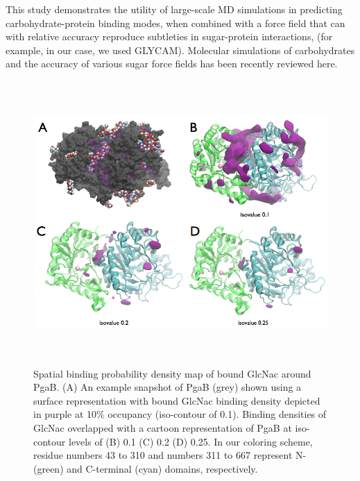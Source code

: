 This study demonstrates the utility of large-scale MD simulations in predicting carbohydrate-protein binding modes, when combined with a force field that can with relative accuracy reproduce subtleties in sugar-protein interactions, (for example, in our case, we used GLYCAM). Molecular simulations of carbohydrates and the accuracy of various sugar force fields has been recently reviewed here.\cite{Fadda:2010p5889}

\begin{figure}[htbp]
\centering
\includegraphics[height=4.25in, width=6in]{figures/results4/figure_pgab_density.png}
\caption[NAG binding density]{Spatial binding probability density map of bound GlcNac around PgaB.  (A) An example snapshot of PgaB (grey) shown using a surface representation with bound GlcNac binding density depicted in purple at 10\% occupancy (iso-contour of 0.1). Binding densities of GlcNac overlapped with a cartoon representation of PgaB at iso-contour levels of (B) 0.1 (C) 0.2 (D) 0.25. In our coloring scheme, residue numbers 43 to 310 and numbers 311 to 667 represent N- (green) and C-terminal (cyan) domains, respectively.  }
\label{fig:pgab_density}
\end{figure}

